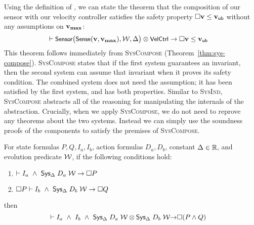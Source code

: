 Using the definition of \SysConjoin{}, we can state the theorem that the
composition of our sensor with our velocity controller satisfies the safety
property $\Box{} \mathbf{v} \leq \mathsf{\mathbf{v}_{ub}}$ without any assumptions on $\mathbf{v_{max}}$:
\[
\vdash {\small \textsf{Sensor}}\big({\small \textsf{Sense}}(\mathbf{v},\mathbf{v_{max}}),\mathcal{W}, \Delta\big) \otimes {\small \textsf{VelCtrl}} \rightarrow \Box{} \mathbf{v} \leq \mathsf{\mathbf{v}_{ub}}
\]
This theorem follows immediately from \textsc{SysCompose}
(Theorem~\ref{thm:sys-compose}).  \textsc{SysCompose} states that if the
first system guarantees an invariant, then the second system can assume
that invariant when it proves its safety condition.  The combined system
does not need the assumption; it has been satisfied by the first system,
and has both properties.  Similar to \textsc{SysInd}, \textsc{SysCompose}
abstracts all of the reasoning for manipulating the internals of the
\SysA{} abstraction.  Crucially, when we apply \textsc{SysCompose}, we do
not need to reprove any theorems about the two systems.  Instead we can
simply use the soundness proofs of the components to satisfy the premises
of \textsc{SysCompose}.

\begin{theorem}
For state formulas $P,Q,I_a,I_b$, action formulas $D_a,D_b$, constant $\Delta \in \mathbb{R}$,
and evolution predicate $\mathcal{W}$, if the following conditions hold:

\begin{enumerate}[label=\roman*), ref=\roman*]
\item
\label{thm:sys-compose-a}
$\vdash I_a~\wedge~{\textsf{Sys}}{}_{\Delta}\;D_a\;\mathcal{W} \rightarrow \Box{} P$
\item
\label{thm:sys-compose-b}
$\Box{} P \vdash I_b~\wedge~{\textsf{Sys}}{}_{\Delta}\;D_b\;\mathcal{W} \rightarrow \Box{} Q$
\end{enumerate}
then
\[
\vdash I_a~\wedge~I_b~\wedge~{\textsf{Sys}}{}_{\Delta}\;D_a\;\mathcal{W} \otimes {\textsf{Sys}}{}_{\Delta}\;D_b\;\mathcal{W} {\rightarrow} \Box{} (P \wedge Q)
\]
\label{thm:sys-compose}
\end{theorem}

